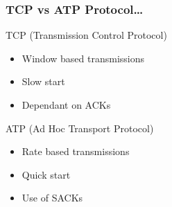 \begin{frame}[t]
  \frametitle{TCP vs ATP Protocol\dots}

  TCP (Transmission Control Protocol)
  \begin{itemize}
  \item Window based transmissions
  \item Slow start
  \item Dependant on ACKs
  \end{itemize}

  \vfill

  ATP (Ad Hoc Transport Protocol)
  \begin{itemize}
  \item Rate based transmissions
  \item Quick start
  \item Use of SACKs
  \end{itemize}

  \vfill

  \begin{flushleft}
    \begin{tiny}
      \begin{minipage}{1.0\linewidth}
      \end{minipage}
    \end{tiny}
  \end{flushleft}
  
\end{frame}

